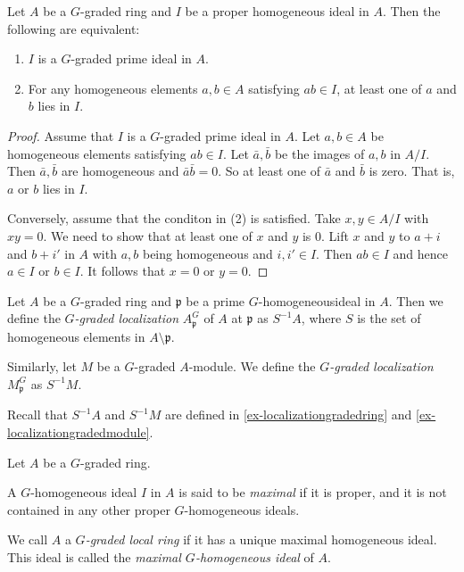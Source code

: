 \begin{proposition}
    Let $A$ be a $G$-graded ring and $I$ be a proper homogeneous ideal in $A$. Then the following are equivalent:
    \begin{enumerate}
        \item $I$ is a $G$-graded prime ideal in $A$.
        \item For any homogeneous elements $a,b\in A$ satisfying $ab\in I$, at least one of $a$ and $b$ lies in $I$.
    \end{enumerate}
\end{proposition}
\begin{proof}
    Assume that $I$ is a $G$-graded prime ideal in $A$. Let $a,b\in A$ be homogeneous elements satisfying $ab\in I$. Let $\bar{a},\bar{b}$ be the images of $a,b$ in $A/I$. Then $\bar{a},\bar{b}$ are homogeneous and $\bar{a}\bar{b}=0$. So at least one of $\bar{a}$ and $\bar{b}$ is zero. That is, $a$ or $b$ lies in $I$.

    Conversely, assume that the conditon in (2) is satisfied. Take $x,y\in A/I$ with $xy=0$. We need to show that at least one of $x$ and $y$ is $0$. Lift $x$ and $y$ to $a+i$ and $b+i'$ in $A$ with $a,b$ being homogeneous and $i,i'\in I$. Then $ab\in I$ and hence $a\in I$ or $b\in I$. It follows that $x=0$ or $y=0$. 
\end{proof}



\begin{definition}
    Let $A$ be a $G$-graded ring and $\mathfrak{p}$ be a prime $G$-homogeneousideal in $A$. Then we define the \emph{$G$-graded localization} $A^G_{\mathfrak{p}}$ of $A$ at $\mathfrak{p}$  as $S^{-1}A$, where $S$ is the set of homogeneous elements in $A\setminus \mathfrak{p}$.

    Similarly, let $M$ be a $G$-graded $A$-module. We define the \emph{$G$-graded localization} $M^G_{\mathfrak{p}}$ as $S^{-1}M$.
\end{definition}
Recall that $S^{-1}A$ and $S^{-1}M$ are defined in \cref{ex-localizationgradedring} and \cref{ex-localizationgradedmodule}. 

\begin{definition}
    Let $A$ be a $G$-graded ring.

    A $G$-homogeneous ideal $I$ in $A$ is said to be \emph{maximal} if it is proper, and it is not contained in any other proper $G$-homogeneous ideals.

    We call $A$ a \emph{$G$-graded local ring} if it has a unique maximal homogeneous ideal. This ideal is called the \emph{maximal $G$-homogeneous ideal} of $A$.
\end{definition}



